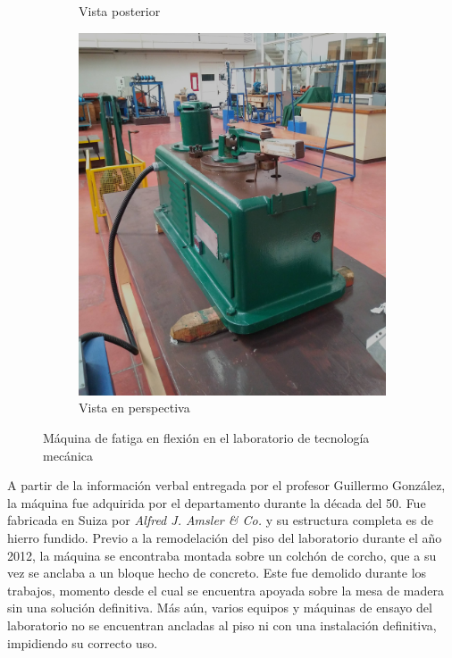 \begin{figure}[h]
\begin{subfigure}{0.49\linewidth}
		\caption{Vista posterior}\label{fig:maqfull_post}
	\end{subfigure}
	\begin{subfigure}{0.5\linewidth}
		\centering		
		\includegraphics[width=1\linewidth]{Imagenes/maq_iso.jpg}
		\caption{Vista en perspectiva}\label{fig:maq_iso}		
	\end{subfigure}
\caption{Máquina de fatiga en flexión en el laboratorio de tecnología mecánica}
\label{fig:maq_fat}
\end{figure}

A partir de la información verbal entregada por el profesor Guillermo González, la máquina fue adquirida por el departamento durante la década del 50. Fue fabricada en Suiza por \textit{Alfred J. Amsler \& Co.} y su estructura completa es de hierro fundido. Previo a la remodelación del piso del laboratorio durante el año 2012, la máquina se encontraba montada sobre un colchón de corcho, que a su vez se anclaba a un bloque hecho de concreto. Este fue demolido durante los trabajos, momento desde el cual se encuentra apoyada sobre la mesa de madera sin una solución definitiva. Más aún, varios equipos y máquinas de ensayo del laboratorio no se encuentran ancladas al piso ni con una instalación definitiva, impidiendo su correcto uso.

